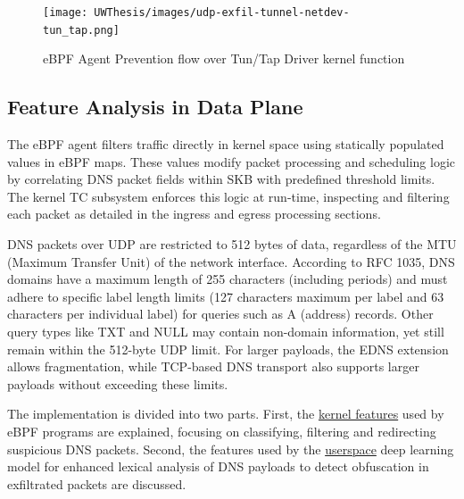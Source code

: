 \documentclass [11pt, proquest] {uwthesis}[2020/02/24]
\begin{document}
\begin{figure}[H]
\texttt{[image: UWThesis/images/udp-exfil-tunnel-netdev-tun\_tap.png]}
\caption{eBPF Agent Prevention flow over Tun/Tap Driver kernel function}
\label{sec:data_plane_tunnel_netdev}
\end{figure}



\subsection{Feature Analysis in Data Plane}
\label{sec:features}
The eBPF agent filters traffic directly in kernel space using statically populated values in eBPF maps. These values modify packet processing and scheduling logic by correlating DNS packet fields within SKB with predefined threshold limits. The kernel TC subsystem enforces this logic at run-time, inspecting and filtering each packet as detailed in the ingress and egress processing sections.

DNS packets over UDP are restricted to 512 bytes of data, regardless of the MTU (Maximum Transfer Unit) of the network interface. According to RFC 1035, DNS domains have a maximum length of 255 characters (including periods) and must adhere to specific label length limits (127 characters maximum per label and 63 characters per individual label) for queries such as A (address) records. Other query types like TXT and NULL may contain non-domain information, yet still remain within the 512-byte UDP limit. For larger payloads, the EDNS extension allows fragmentation, while TCP-based DNS transport also supports larger payloads without exceeding these limits.

The implementation is divided into two parts. First, the  \hyperref[sec:kernel-features]{kernel features} used by eBPF programs are explained, focusing on classifying, filtering and redirecting suspicious DNS packets. Second, the features used by the \hyperref[sec:userspace-features]{userspace} deep learning model for enhanced lexical analysis of DNS payloads to detect obfuscation in exfiltrated packets are discussed.
\end{document}
